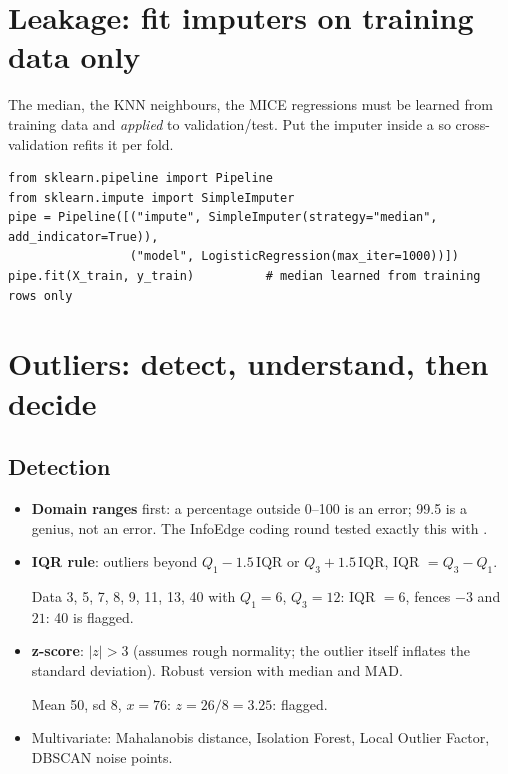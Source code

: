 \section{Leakage: fit imputers on training data only}
The median, the KNN neighbours, the MICE regressions must be learned from training data and \emph{applied} to validation/test. Put
the imputer inside a  so cross-validation refits it per fold.
\begin{lstlisting}
from sklearn.pipeline import Pipeline
from sklearn.impute import SimpleImputer
pipe = Pipeline([("impute", SimpleImputer(strategy="median", add_indicator=True)),
                 ("model", LogisticRegression(max_iter=1000))])
pipe.fit(X_train, y_train)          # median learned from training rows only
\end{lstlisting}

\section{Outliers: detect, understand, then decide}
\subsection{Detection}
\begin{itemize}
\item \textbf{Domain ranges} first: a percentage outside 0--100 is an error; 99.5 is a genius, not an error. The InfoEdge coding round
  tested exactly this with .
\item \textbf{IQR rule}: outliers beyond $Q_1 - 1.5\,\text{IQR}$ or $Q_3 + 1.5\,\text{IQR}$, IQR $= Q_3 - Q_1$.
  \begin{example}[: IQR]
  Data 3, 5, 7, 8, 9, 11, 13, 40 with $Q_1 = 6$, $Q_3 = 12$: IQR $= 6$, fences $-3$ and $21$: 40 is flagged.
  \end{example}
\item \textbf{z-score}: $|z| > 3$ (assumes rough normality; the outlier itself inflates the standard deviation). Robust version with
  median and MAD.
  \begin{example}[: z-score]
  Mean 50, sd 8, $x = 76$: $z = 26/8 = 3.25$: flagged.
  \end{example}
\item Multivariate: Mahalanobis distance, Isolation Forest, Local Outlier Factor, DBSCAN noise points.
\end{itemize}

